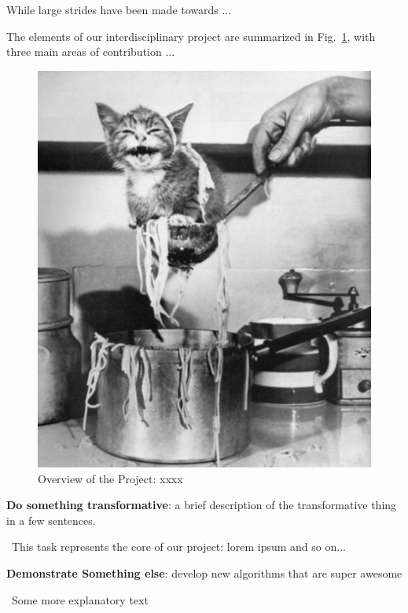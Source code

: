 While large strides have been made towards ...

The elements of our interdisciplinary project are summarized in Fig.~\ref{fig:overview}, with three main areas of contribution ...

\begin{figure}[!b]
\centering
\includegraphics [scale=0.38]{figures/overview.pdf}
\vspace{2mm}
\caption{Overview of the Project: xxxx}
\label{fig:overview}
\end{figure}


\vspace{.5ex}
\begin{myaim}
{\bf Do something transformative}: a brief description of the transformative thing in a few sentences.
\end{myaim}
\vspace*{-1.1ex}
\hangindent=10pt \ This task represents the core of our project: lorem ipsum and so on...

\vspace{.5ex}
\begin{myaim}
{\bf Demonstrate Something else}: develop new algorithms that are super awesome
\end{myaim}
\vspace*{-1.1ex}
\hangindent=10pt \ Some more explanatory text

